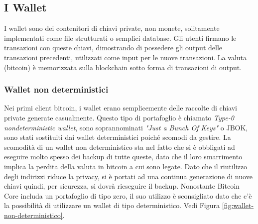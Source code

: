 \subsection*{I Wallet}
I wallet sono dei contenitori di chiavi private, non monete, solitamente implementati come file strutturati o semplici database. Gli utenti firmano le transazioni con queste chiavi, dimostrando di possedere gli output delle transazioni precedenti, utilizzati come input per le nuove transazioni. La valuta (bitcoin) è memorizzata sulla blockchain sotto forma di transazioni di output.
\subsubsection{Wallet non deterministici}
Nei primi client bitcoin, i wallet erano semplicemente delle raccolte di chiavi private generate casualmente. Questo tipo di portafoglio è chiamato \textit{Type-0 nondeterministic wallet}, sono soprannominati \textit{"Just a Bunch Of Keys"} o JBOK, sono stati sostituiti dai wallet deterministici poiché scomodi da gestire. La scomodità di un wallet non deterministico sta nel fatto che si è obbligati ad eseguire molto spesso dei backup di tutte queste, dato che il loro smarrimento implica la perdita della valuta in bitcoin a cui sono legate. Dato che il riutilizzo degli indirizzi riduce la privacy, si è portati ad una continua generazione di nuove chiavi quindi, per sicurezza, si dovrà rieseguire il backup. Nonostante Bitcoin Core includa un portafoglio di tipo zero, il suo utilizzo è sconsigliato dato che c'è la possibilità di utilizzare un wallet di tipo deterministico. Vedi Figura \ref*{fig:wallet-non-deterministico}.

